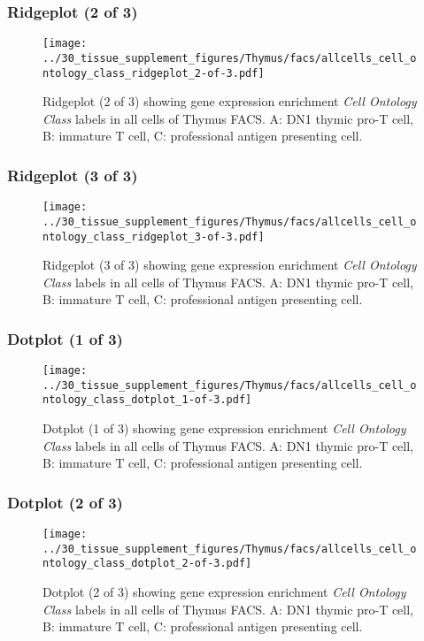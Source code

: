 \clearpage

\subsubsection{Ridgeplot (2 of 3)}
\begin{figure}[h]
\centering
\texttt{[image: ../30\_tissue\_supplement\_figures/Thymus/facs/allcells\_cell\_ontology\_class\_ridgeplot\_2-of-3.pdf]}

\caption{ Ridgeplot (2 of 3)  showing gene expression enrichment \emph{Cell Ontology Class} labels in all cells of Thymus FACS. A: DN1 thymic pro-T cell, B: immature T cell, C: professional antigen presenting cell.}
\end{figure}


\clearpage

\subsubsection{Ridgeplot (3 of 3)}
\begin{figure}[h]
\centering
\texttt{[image: ../30\_tissue\_supplement\_figures/Thymus/facs/allcells\_cell\_ontology\_class\_ridgeplot\_3-of-3.pdf]}

\caption{ Ridgeplot (3 of 3)  showing gene expression enrichment \emph{Cell Ontology Class} labels in all cells of Thymus FACS. A: DN1 thymic pro-T cell, B: immature T cell, C: professional antigen presenting cell.}
\end{figure}


\clearpage

\subsubsection{Dotplot (1 of 3)}
\begin{figure}[h]
\centering
\texttt{[image: ../30\_tissue\_supplement\_figures/Thymus/facs/allcells\_cell\_ontology\_class\_dotplot\_1-of-3.pdf]}

\caption{ Dotplot (1 of 3)  showing gene expression enrichment \emph{Cell Ontology Class} labels in all cells of Thymus FACS. A: DN1 thymic pro-T cell, B: immature T cell, C: professional antigen presenting cell.}
\end{figure}


\clearpage

\subsubsection{Dotplot (2 of 3)}
\begin{figure}[h]
\centering
\texttt{[image: ../30\_tissue\_supplement\_figures/Thymus/facs/allcells\_cell\_ontology\_class\_dotplot\_2-of-3.pdf]}

\caption{ Dotplot (2 of 3)  showing gene expression enrichment \emph{Cell Ontology Class} labels in all cells of Thymus FACS. A: DN1 thymic pro-T cell, B: immature T cell, C: professional antigen presenting cell.}
\end{figure}


